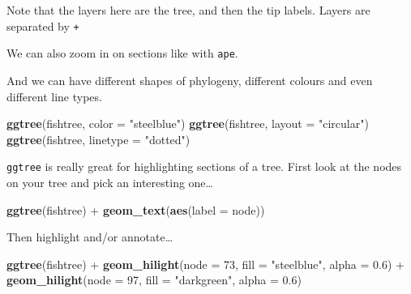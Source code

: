 \documentclass[]{book}
\newenvironment{Shaded}{\begin{snugshade}}{\end{snugshade}}
\newcommand{\KeywordTok}[1]{\textcolor[rgb]{0.13,0.29,0.53}{\textbf{{#1}}}}
\newcommand{\DataTypeTok}[1]{\textcolor[rgb]{0.13,0.29,0.53}{{#1}}}
\newcommand{\DecValTok}[1]{\textcolor[rgb]{0.00,0.00,0.81}{{#1}}}
\newcommand{\FloatTok}[1]{\textcolor[rgb]{0.00,0.00,0.81}{{#1}}}
\newcommand{\StringTok}[1]{\textcolor[rgb]{0.31,0.60,0.02}{{#1}}}
\newcommand{\NormalTok}[1]{{#1}}
\theoremstyle{definition}
\theoremstyle{definition}
\theoremstyle{definition}
\theoremstyle{remark}
\begin{document}
Note that the layers here are the tree, and then the tip labels. Layers
are separated by \texttt{+}

We can also zoom in on sections like with \texttt{ape}.

\begin{Shaded}
\end{Shaded}

And we can have different shapes of phylogeny, different colours and
even different line types.

\begin{Shaded}
\begin{Highlighting}[]
\KeywordTok{ggtree}\NormalTok{(fishtree, }\DataTypeTok{color =} \StringTok{"steelblue"}\NormalTok{)}
\KeywordTok{ggtree}\NormalTok{(fishtree, }\DataTypeTok{layout =} \StringTok{"circular"}\NormalTok{)}
\KeywordTok{ggtree}\NormalTok{(fishtree, }\DataTypeTok{linetype =} \StringTok{"dotted"}\NormalTok{)}
\end{Highlighting}
\end{Shaded}

\texttt{ggtree} is really great for highlighting sections of a tree.
First look at the nodes on your tree and pick an interesting one\ldots{}

\begin{Shaded}
\begin{Highlighting}[]
\KeywordTok{ggtree}\NormalTok{(fishtree) +}\StringTok{ }
\StringTok{  }\KeywordTok{geom_text}\NormalTok{(}\KeywordTok{aes}\NormalTok{(}\DataTypeTok{label =} \NormalTok{node))}
\end{Highlighting}
\end{Shaded}

Then highlight and/or annotate\ldots{}

\begin{Shaded}
\begin{Highlighting}[]
\KeywordTok{ggtree}\NormalTok{(fishtree) +}
\KeywordTok{geom_hilight}\NormalTok{(}\DataTypeTok{node =} \DecValTok{73}\NormalTok{, }\DataTypeTok{fill =} \StringTok{"steelblue"}\NormalTok{, }\DataTypeTok{alpha =} \FloatTok{0.6}\NormalTok{) +}
\KeywordTok{geom_hilight}\NormalTok{(}\DataTypeTok{node =} \DecValTok{97}\NormalTok{, }\DataTypeTok{fill =} \StringTok{"darkgreen"}\NormalTok{, }\DataTypeTok{alpha =} \FloatTok{0.6}\NormalTok{)}
\end{Highlighting}
\end{Shaded}
\end{document}
